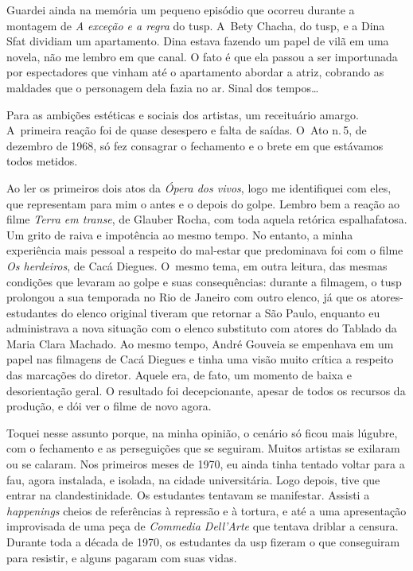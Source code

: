 Guardei ainda na memória um pequeno episódio que ocorreu durante a montagem de
{\it A exceção e a regra} do {\sc tusp}. A~Bety Chacha, do {\sc tusp}, e a Dina Sfat
dividiam um apartamento. Dina estava fazendo um papel de vilã em uma
novela, não me lembro em que canal. O fato é que ela passou a ser
importunada por espectadores que vinham até o apartamento abordar a
atriz, cobrando as maldades que o personagem dela fazia no ar. Sinal dos
tempos\ldots{}

Para as ambições estéticas e sociais dos artistas, um receituário
amargo. A~primeira reação foi de quase desespero e falta de saídas. O~Ato
n.\,5, de dezembro de 1968, só fez consagrar o fechamento e o brete em
que estávamos todos metidos.

Ao ler os primeiros dois atos da {\it Ópera dos vivos}, logo me
identifiquei com eles, que representam para mim o antes e
o depois do golpe. Lembro bem a reação ao filme {\it Terra em transe}, de
Glauber Rocha, com toda aquela retórica espalhafatosa. Um grito de raiva
e impotência ao mesmo tempo. No entanto, a minha experiência mais
pessoal a respeito do mal-estar que predominava foi com o filme
{\it Os herdeiros}, de Cacá Diegues. O~mesmo tema, em outra leitura, das
mesmas condições que levaram ao golpe e suas consequências: durante a
filmagem, o {\sc tusp} prolongou a sua temporada no Rio de Janeiro com outro
elenco, já que os atores-estudantes do elenco original tiveram que
retornar a São Paulo, enquanto eu administrava a nova situação com o elenco substituto
com atores do Tablado da Maria Clara Machado. Ao mesmo tempo, André
Gouveia se empenhava em um papel nas filmagens de Cacá Diegues
e tinha uma visão muito crítica a respeito das marcações do diretor.
Aquele era, de fato, um momento de baixa e desorientação geral. O
resultado foi decepcionante, apesar de todos os recursos da produção, e
dói ver o filme de novo agora.

Toquei nesse assunto porque, na minha opinião, o cenário só
ficou mais lúgubre, com o fechamento e as perseguições que se seguiram.
Muitos artistas se exilaram ou se calaram. Nos primeiros meses de 1970,
eu ainda tinha tentado voltar para a {\sc fau}, agora instalada, e isolada, na
cidade universitária. Logo depois, tive que entrar na clandestinidade. Os
estudantes tentavam se manifestar. Assisti a {\it happenings} cheios de
referências à repressão e à tortura, e até a uma apresentação improvisada
de uma peça de {\it Commedia Dell'Arte} que tentava driblar a censura. Durante toda
a década de 1970, os estudantes da {\sc usp} fizeram o que conseguiram para
resistir, e alguns pagaram com suas vidas.

